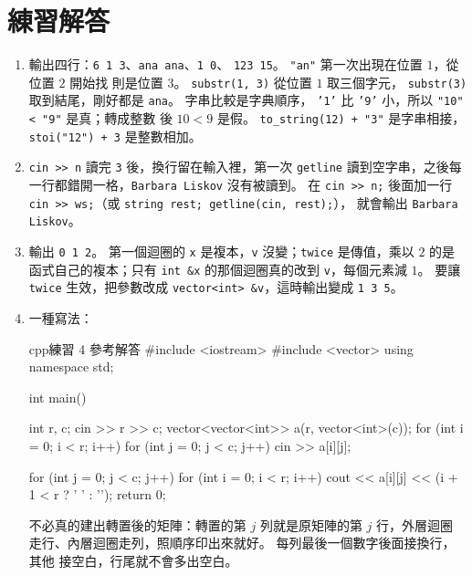 \section*{練習解答}

\begin{enumerate}
\item 輸出四行：\texttt{6 1 3}、\texttt{ana ana}、\texttt{1 0}、
\texttt{123 15}。 \texttt{"an"} 第一次出現在位置 $1$，從位置 $2$ 開始找
則是位置 $3$。 \texttt{substr(1, 3)} 從位置 $1$ 取三個字元，
\texttt{substr(3)} 取到結尾，剛好都是 \texttt{ana}。 字串比較是字典順序，
\texttt{'1'} 比 \texttt{'9'} 小，所以 \texttt{"10" < "9"} 是真；轉成整數
後 $10 < 9$ 是假。 \texttt{to\_string(12) + "3"} 是字串相接，
\texttt{stoi("12") + 3} 是整數相加。
\item \texttt{cin >> n} 讀完 \texttt{3} 後，換行留在輸入裡，第一次
\texttt{getline} 讀到空字串，之後每一行都錯開一格，\texttt{Barbara
Liskov} 沒有被讀到。 在 \texttt{cin >> n;} 後面加一行
\texttt{cin >> ws;}（或 \texttt{string rest; getline(cin, rest);}），
就會輸出 \texttt{Barbara Liskov}。
\item 輸出 \texttt{0 1 2}。 第一個迴圈的 \texttt{x} 是複本，\texttt{v}
沒變；\texttt{twice} 是傳值，乘以 $2$ 的是函式自己的複本；只有
\texttt{int \&x} 的那個迴圈真的改到 \texttt{v}，每個元素減 $1$。 要讓
\texttt{twice} 生效，把參數改成 \texttt{vector<int> \&v}，這時輸出變成
\texttt{1 3 5}。
\item 一種寫法：
\begin{code}{cpp}{練習 4 參考解答}
#include <iostream>
#include <vector>
using namespace std;

int main() {
    int r, c;
    cin >> r >> c;
    vector<vector<int>> a(r, vector<int>(c));
    for (int i = 0; i < r; i++) {
        for (int j = 0; j < c; j++) {
            cin >> a[i][j];
        }
    }

    for (int j = 0; j < c; j++) {
        for (int i = 0; i < r; i++) {
            cout << a[i][j] << (i + 1 < r ? ' ' : '\n');
        }
    }
    return 0;
}
\end{code}
不必真的建出轉置後的矩陣：轉置的第 $j$ 列就是原矩陣的第 $j$ 行，外層迴圈
走行、內層迴圈走列，照順序印出來就好。 每列最後一個數字後面接換行，其他
接空白，行尾就不會多出空白。
\end{enumerate}
